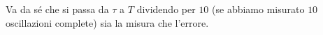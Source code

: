 \documentclass{lab1-article}
\begin{document}
\begin{article}
Va da s\'e che si passa da $\tau$ a $T$ dividendo per $10$ (se abbiamo
misurato $10$ oscillazioni complete) sia la misura che l'errore.

\onecolumn



\end{article}
\end{document}
